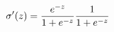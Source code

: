 \documentclass[preview]{standalone}
\begin{document}
\begin{align*}
\special{dvisvgm:raw <g id='unique000'>}\sigma^\prime(z)=\frac{e^{-z}}{1+e^{-z}}\frac{1}{1+e^{-z}}\special{dvisvgm:raw </g>}
\end{align*}
\end{document}
